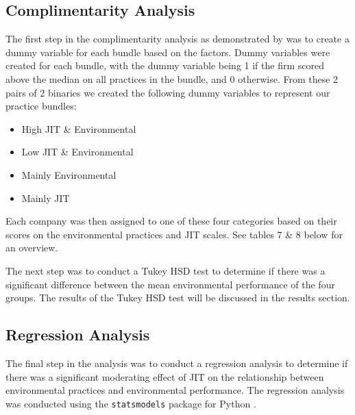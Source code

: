 \subsection*{Complimentarity Analysis}
The first step in the complimentarity analysis as demonstrated by \citep{furlanComplementarityLeanManufacturing2011} was to create a dummy variable for each bundle based on the factors.
Dummy variables were created for each bundle, with the dummy variable being 1 if the firm scored above the median on all practices in the bundle, and 0 otherwise.
From these 2 pairs of 2 binaries we created the following dummy variables to represent our practice bundles:
\begin{itemize}
    \item High JIT \& Environmental
    \item Low JIT \& Environmental
    \item Mainly Environmental
    \item Mainly JIT
\end{itemize}
Each company was then assigned to one of these four categories based on their scores on the environmental practices and JIT scales. See tables 7 \& 8 below for an overview. 


The next step was to conduct a Tukey HSD test to determine if there was a significant difference between the mean environmental performance of the four groups.
The results of the Tukey HSD test will be discussed in the results section.
\subsection*{Regression Analysis}
The final step in the analysis was to conduct a regression analysis to determine if there was a significant moderating effect of JIT on the relationship between environmental practices and environmental performance.
The regression analysis was conducted using the \texttt{statsmodels} package for Python \citep{seaboldStatsmodelsEconometricStatistical2010}.

